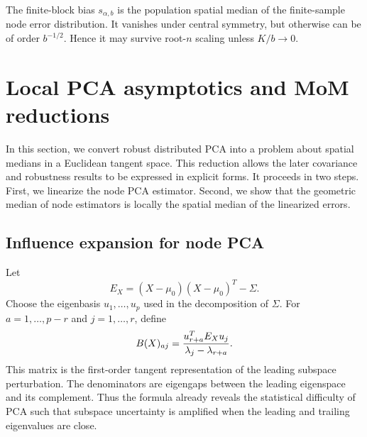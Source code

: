 \documentclass[11pt]{article}
\begin{document}
The finite-block bias \(s_{\alpha,b}\) is the population spatial median of the
finite-sample node error distribution.  It vanishes under central symmetry, but
otherwise can be of order \(b^{-1/2}\).  Hence it may survive root-\(n\)
scaling unless \(K/b\to0\).

\section{Local PCA asymptotics and MoM reductions}\label{sec:local}

In this section, we convert robust distributed PCA into a problem about spatial medians in a Euclidean tangent space.  This reduction allows the later covariance and robustness results to be expressed in explicit forms.  It proceeds in two steps.  First, we linearize the node PCA estimator.  Second, we show that the geometric median of node estimators is locally the spatial median of the linearized errors.

\subsection{Influence expansion for node PCA}

Let
\[
    E_X=(X-\mu_0)(X-\mu_0)^T-\Sigma.
\]
Choose the eigenbasis \(u_1,\ldots,u_p\) used in the decomposition of \(\Sigma\).  For \(a=1,
\ldots,p-r\) and \(j=1,\ldots,r\), define
\begin{equation}\label{eq:B-influence}
    B(X)_{aj}
    ={u_{r+a}^T E_X u_j\over \lambda_j-\lambda_{r+a}}.
\end{equation}
This matrix is the first-order tangent representation of the leading subspace perturbation.  The denominators are eigengaps between the leading eigenspace and its complement.  Thus the formula already reveals the statistical difficulty of PCA such that subspace uncertainty is amplified when the leading and trailing eigenvalues are close.
\end{document}
